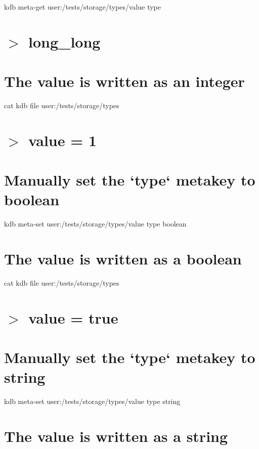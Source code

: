 kdb meta-\/get \textquotesingle{}user\+:/tests/storage/types/value\textquotesingle{} \textquotesingle{}type\textquotesingle{} \hypertarget{autotoc_md635_autotoc_md658}{}\section{$>$ long\+\_\+long}\label{autotoc_md635_autotoc_md658}
\hypertarget{autotoc_md635_autotoc_md659}{}\section{The value is written as an integer}\label{autotoc_md635_autotoc_md659}
cat {\ttfamily kdb file user\+:/tests/storage/types} \hypertarget{autotoc_md635_autotoc_md660}{}\section{$>$ value = 1}\label{autotoc_md635_autotoc_md660}
\hypertarget{autotoc_md635_autotoc_md661}{}\section{Manually set the `type` metakey to boolean}\label{autotoc_md635_autotoc_md661}
kdb meta-\/set \textquotesingle{}user\+:/tests/storage/types/value\textquotesingle{} \textquotesingle{}type\textquotesingle{} \textquotesingle{}boolean\textquotesingle{}\hypertarget{autotoc_md635_autotoc_md662}{}\section{The value is written as a boolean}\label{autotoc_md635_autotoc_md662}
cat {\ttfamily kdb file user\+:/tests/storage/types} \hypertarget{autotoc_md635_autotoc_md663}{}\section{$>$ value = true}\label{autotoc_md635_autotoc_md663}
\hypertarget{autotoc_md635_autotoc_md664}{}\section{Manually set the `type` metakey to string}\label{autotoc_md635_autotoc_md664}
kdb meta-\/set \textquotesingle{}user\+:/tests/storage/types/value\textquotesingle{} \textquotesingle{}type\textquotesingle{} \textquotesingle{}string\textquotesingle{}\hypertarget{autotoc_md635_autotoc_md665}{}\section{The value is written as a string}\label{autotoc_md635_autotoc_md665}

